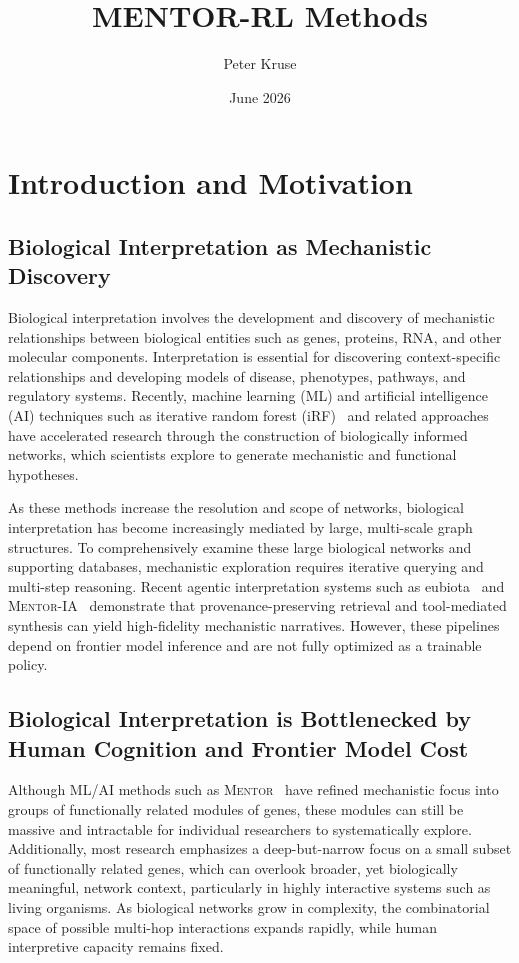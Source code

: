 \documentclass[thesis,letterpaper,12pt]{utthesis}
\title{MENTOR-RL Methods}
\author{Peter Kruse}
\date{June 2026}
\begin{document}
\maketitle

\section{Introduction and Motivation}

\subsection{Biological Interpretation as Mechanistic Discovery}
Biological interpretation involves the development and discovery of mechanistic relationships between biological entities such as genes, proteins, RNA, and other molecular components. Interpretation is essential for discovering context-specific relationships and developing models of disease, phenotypes, pathways, and regulatory systems. Recently, machine learning (ML) and artificial intelligence (AI) techniques such as iterative random forest (iRF)~\cite{basu2018iterative, cliff2019high} and related approaches have accelerated research through the construction of biologically informed networks, which scientists explore to generate mechanistic and functional hypotheses.

As these methods increase the resolution and scope of networks, biological interpretation has become increasingly mediated by large, multi-scale graph structures. To comprehensively examine these large biological networks and supporting databases, mechanistic exploration requires iterative querying and multi-step reasoning. Recent agentic interpretation systems such as eubiota~\cite{eubiota} and \textsc{Mentor-IA}~\cite{mentor-ia} demonstrate that provenance-preserving retrieval and tool-mediated synthesis can yield high-fidelity mechanistic narratives. However, these pipelines depend on frontier model inference and are not fully optimized as a trainable policy.

\subsection{Biological Interpretation is Bottlenecked by Human Cognition and Frontier Model Cost}
Although ML/AI methods such as \textsc{Mentor}~\cite{mentor} have refined mechanistic focus into groups of functionally related modules of genes, these modules can still be massive and intractable for individual researchers to systematically explore. Additionally, most research emphasizes a deep-but-narrow focus on a small subset of functionally related genes, which can overlook broader, yet biologically meaningful, network context, particularly in highly interactive systems such as living organisms. As biological networks grow in complexity, the combinatorial space of possible multi-hop interactions expands rapidly, while human interpretive capacity remains fixed.
\end{document}
